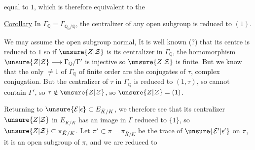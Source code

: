 equal to $1$, which is therefore equivalent to the

\uline{Corollary} In $\Gamma_{\mathbb Q}=\Gamma_{\overline{\mathbb Q}_0/\mathbb Q}$, the centralizer of any open subgroup is reduced to $(1)$.

We may assume the open subgroup  normal, It is well known (?) that its centre is reduced to $1$
so if $\unsure{Z|\mathcal Z}$ is its centralizer in $\Gamma_{\mathbb Q}$, the homomorphism $\unsure{Z|\mathcal Z}\longrightarrow\Gamma_{\mathbb Q}/\Gamma'$ is injective so $\unsure{Z|\mathcal Z}$ is finite. But we know that the only  $\neq1$ of $\Gamma_{\mathbb Q}$ of finite order are the conjugates of $\tau$, complex conjugation. But the centralizer of $\tau$ in $\Gamma_{\overline{\mathbb Q}}$ is reduced to $(1,\tau)$, so cannot contain $\Gamma'$, so $\tau\notin\unsure{Z|\mathcal Z}$, so $\unsure{Z|\mathcal Z}=(1)$.

Returning to $\unsure{\mathcal E|\epsilon}\subset E_{\bar K/K}$, we therefore see that its centralizer $\unsure{Z|\mathcal Z}$ in $E_{\bar K/K}$ has an image in $\Gamma$ reduced to $\{1\}$, so $\unsure{Z|\mathcal Z}\subset\pi_{\bar K/K}$. Let $\pi'\subset\pi=\pi_{\bar K/K}$ be the trace of $\unsure{\mathcal E'|\epsilon'}$ on $\pi$, it is an open subgroup of $\pi$, and we are reduced to
